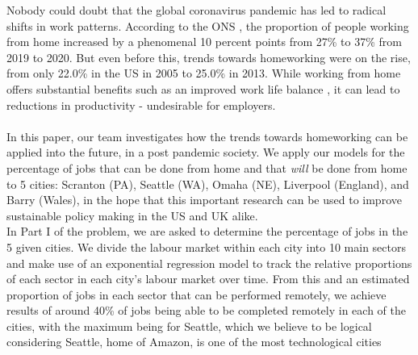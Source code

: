 \documentclass{mthree}
\begin{document}

       
       Nobody could doubt that the global coronavirus pandemic has led to radical shifts in work patterns. According to the ONS \cite{ONS}, the proportion of people working from home increased by a phenomenal 10 percent points from 27\% to 37\% from 2019 to 2020. But even before this, trends towards homeworking were on the rise, from only 22.0\% in the US in 2005 to 25.0\% in 2013. While working from home offers substantial benefits such as an improved work life balance \cite{ONS}, it can lead to reductions in productivity - undesirable for employers.
       \\ \\
       In this paper, our team investigates how the trends towards homeworking can be applied into the future, in a post pandemic society. We apply our models for the percentage of jobs that can be done from home and that \textit{will} be done from home to 5 cities: Scranton (PA), Seattle (WA), Omaha (NE), Liverpool (England), and Barry (Wales), in the hope that this important research can be used to improve sustainable policy making in the US and UK alike.\\
      
       In Part I of the problem, we are asked to determine the percentage of jobs in the 5 given cities. We divide the labour market within each city into 10 main sectors and make use of an exponential regression model to track the relative proportions of each sector in each city's labour market over time. From this and an estimated proportion of jobs in each sector that can be performed remotely, we achieve results of around 40\% of jobs being able to be completed remotely in each of the cities, with the maximum being for Seattle, which we believe to be logical considering Seattle, home of Amazon, is one of the most technological cities\\
       
\end{document}
